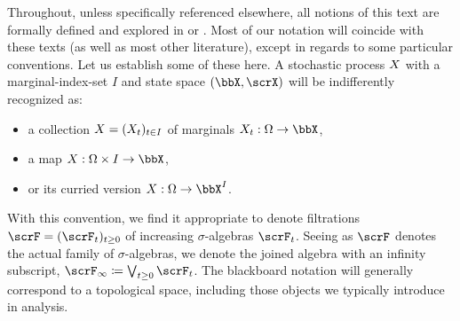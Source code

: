 Throughout, unless specifically referenced elsewhere, all notions of this text are formally defined and explored in \cite{Kallenberg2002} or \cite{jacod2003}.
Most of our notation will coincide with these texts (as well as most other literature), except in regards to some particular conventions.
Let us establish some of these here.
A stochastic process $X$ with a marginal-index-set $I$ and state space $(\stateSpace, \stateAlg)$ will be indifferently recognized as:
\begin{itemize}
  \item
    a collection $X=(X_t)_{t\in I}$ of marginals $\X_t: \Omega \rightarrow \stateSpace$,
  \item
    a map $\X: \Omega \times I \rightarrow \stateSpace$, 
  \item
    or its curried version $\X: \Omega \rightarrow \stateSpace^I$.
\end{itemize}
With this convention, we find it appropriate to denote filtrations $\scrF=(\scrF_t)_{t\geq0}$ of increasing $\sigma$-algebras $\scrF_t$.
Seeing as $\scrF$ denotes the actual family of $\sigma$-algebras, we denote the joined algebra with an infinity subscript, $\scrF_\infty \defeq \bigvee_{t\geq0} \scrF_t$.
The blackboard notation will generally correspond to a topological space, including those objects we typically introduce in analysis.
